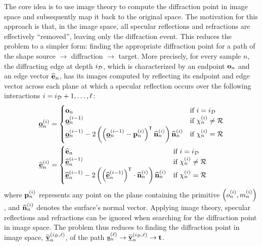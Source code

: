 The core idea is to use image theory to compute the diffraction point in image space and subsequently map it back to the original space.
The motivation for this approach is that, in the image space, all specular reflections and refractions are effectively ``removed'', leaving only the diffraction event.
This reduces the problem to a simpler form: finding the appropriate diffraction point for a path of the shape source $\rightarrow$ diffraction $\rightarrow$ target.
More precisely, for every sample $n$, the diffracting edge at depth $i_{{\cal D}}$, which is characterized by an endpoint $\mathbf{o}_n$ and an edge vector $\widehat{\mathbf{e}}_n$, has its images computed by reflecting its endpoint and edge vector across each plane at which a specular reflection occurs over the following interactions $i = i_{{\cal D}}+1, \dots, \ell$:
\begin{equation}
    \begin{aligned}
        \underline{\mathbf{o}}_n^{(i)} &=
        \begin{cases}
            \mathbf{o}_n & \text{if } i = i_{{\cal D}} \\
            \underline{\mathbf{o}}_n^{(i-1)} & \text{if } \chi_n^{(i)} \neq {\cal R} \\
            \underline{\mathbf{o}}_n^{(i-1)} - 2\left( \left(\underline{\mathbf{o}}_n^{(i-1)} - \mathbf{p}_n^{(i)}\right)^{\mathsf{T}} \widehat{\mathbf{n}}_n^{(i)}\right) \widehat{\mathbf{n}}_n^{(i)} & \text{if } \chi_n^{(i)} = {\cal R}
        \end{cases}\\
        \widehat{\underline{\mathbf{e}}}_n^{(i)} &=
        \begin{cases}
            \widehat{\mathbf{e}}_n & \text{if } i = i_{{\cal D}} \\
            \widehat{\underline{\mathbf{e}}}_n^{(i-1)} & \text{if } \chi_n^{(i)} \neq {\cal R} \\
            \widehat{\underline{\mathbf{e}}}_n^{(i-1)} - 2\left(\left(\widehat{\underline{\mathbf{e}}}_n^{(i-1)}\right)^{\mathsf{T}} \cdot \widehat{\mathbf{n}}_n^{(i)}\right) \widehat{\mathbf{n}}_n^{(i)} & \text{if } \chi_n^{(i)} = {\cal R}
        \end{cases}
    \end{aligned}
\end{equation}
where $\mathbf{p}_n^{(i)}$ represents any point on the plane containing the primitive $\left( o_n^{(i)}, m_n^{(i)} \right)$, and $\widehat{\mathbf{n}}_n^{(i)}$ denotes the surface's normal vector.
Applying image theory, specular reflections and refractions can be ignored when searching for the diffraction point in image space.
The problem thus reduces to finding the diffraction point in image space, $\underline{\widetilde{\mathbf{v}}}_n^{(i_{{\cal D}}, \ell)}$, of the path $\underline{\mathbf{s}}_n^{(\ell)} \rightarrow \underline{\widetilde{\mathbf{v}}}_n^{(i_{{\cal D}}, \ell)} \rightarrow \mathbf{t}$.
